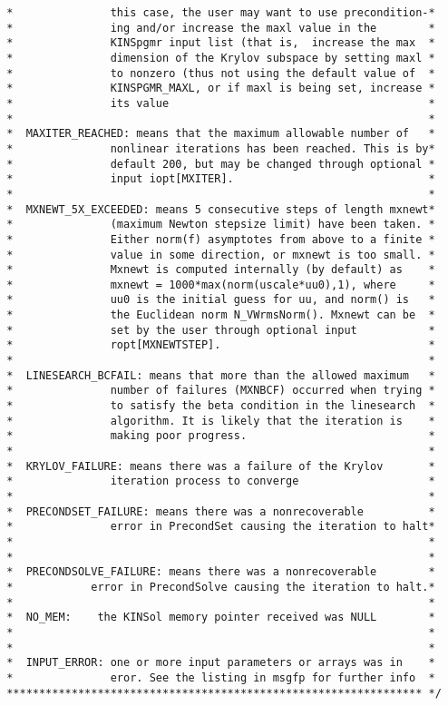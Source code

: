 \begin{verbatim}
 *               this case, the user may want to use precondition-*
 *               ing and/or increase the maxl value in the        * 
 *               KINSpgmr input list (that is,  increase the max  *
 *               dimension of the Krylov subspace by setting maxl *
 *               to nonzero (thus not using the default value of  *
 *               KINSPGMR_MAXL, or if maxl is being set, increase *
 *               its value                                        *
 *                                                                *
 *  MAXITER_REACHED: means that the maximum allowable number of   *
 *               nonlinear iterations has been reached. This is by*
 *               default 200, but may be changed through optional *
 *               input iopt[MXITER].                              *
 *                                                                *
 *  MXNEWT_5X_EXCEEDED: means 5 consecutive steps of length mxnewt*
 *               (maximum Newton stepsize limit) have been taken. *
 *               Either norm(f) asymptotes from above to a finite *
 *               value in some direction, or mxnewt is too small. *
 *               Mxnewt is computed internally (by default) as    *
 *               mxnewt = 1000*max(norm(uscale*uu0),1), where     *
 *               uu0 is the initial guess for uu, and norm() is   *
 *               the Euclidean norm N_VWrmsNorm(). Mxnewt can be  *
 *               set by the user through optional input           *
 *               ropt[MXNEWTSTEP].                                *
 *                                                                *
 *  LINESEARCH_BCFAIL: means that more than the allowed maximum   *
 *               number of failures (MXNBCF) occurred when trying *
 *               to satisfy the beta condition in the linesearch  *
 *               algorithm. It is likely that the iteration is    *
 *               making poor progress.                            *
 *                                                                *
 *  KRYLOV_FAILURE: means there was a failure of the Krylov       *
 *               iteration process to converge                    *
 *                                                                *
 *  PRECONDSET_FAILURE: means there was a nonrecoverable          *
 *               error in PrecondSet causing the iteration to halt*
 *                                                                *
 *                                                                *
 *  PRECONDSOLVE_FAILURE: means there was a nonrecoverable        *
 *            error in PrecondSolve causing the iteration to halt.*
 *                                                                *
 *  NO_MEM:    the KINSol memory pointer received was NULL        *
 *                                                                *
 *                                                                *
 *  INPUT_ERROR: one or more input parameters or arrays was in    *
 *               eror. See the listing in msgfp for further info  *
 **************************************************************** */
\end{verbatim}
\normalsize

